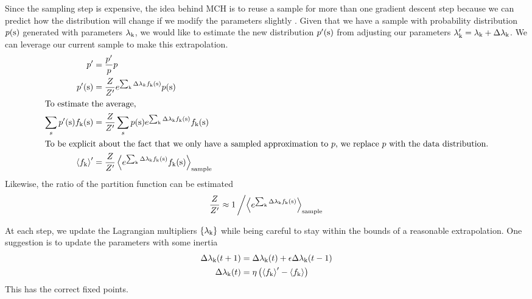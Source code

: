 \documentclass[aps,prl,twocolumn,nofootinbib]{revtex4-1}
\begin{document}
Since the sampling step is expensive, the idea behind MCH is to reuse a sample for more than one gradient descent step because we can predict how the distribution will change if we modify the parameters slightly \cite{Broderick:2007wq}. Given that we have a sample with probability distribution $p({\rm s})$ generated with parameters $\lambda_{\rm k}$, we would like to estimate the new distribution $p'({\rm s})$ from adjusting our parameters $\lambda_{\rm k}' = \lambda_{\rm k}+\Delta\lambda_{\rm k}$. We can leverage our current sample to make this extrapolation.
\begin{align}
	p' &= \frac{p'}{p}p\\
	p'({\rm s})	&= \frac{Z}{Z'}e^{\sum_{\rm k} \Delta\lambda_k f_{\rm k}({\rm s})} p({\rm s})\\
\intertext{To estimate the average,}
	\sum_s p'({\rm s}) f_{\rm k}({\rm s}) &= \frac{Z}{Z'} \sum_s p({\rm s}) e^{\sum_{\rm k} \Delta\lambda_{\rm k} f_{\rm k}({\rm s})} f_{\rm k}({\rm s})\\
\intertext{To be explicit about the fact that we only have a sampled approximation to $p$, we replace $p$ with the data distribution.}
	\left<f_{\rm k}\right>' &= \frac{Z}{Z'} \left<e^{\sum_{\rm k} \Delta\lambda_{\rm k} f_{\rm k}({\rm s})} f_{\rm k}({\rm s})\right>_{\rm sample}
\end{align}
Likewise, the ratio of the partition function can be estimated
\begin{align}
	\frac{Z}{Z'} \approx 1\left/\left<e^{\sum_{\rm k} \Delta\lambda_{\rm k} f_{\rm k}({\rm s})}\right>_{\rm sample}\right.
\end{align}

At each step, we update the Lagrangian multipliers $\{\lambda_{\rm k}\}$ while being careful to stay within the bounds of a reasonable extrapolation. One suggestion is to update the parameters with some inertia
\begin{align}
	\Delta\lambda_{\rm k}(t+1) &= \Delta \lambda_{\rm k}(t) + \epsilon \Delta\lambda_{\rm k}(t-1)\label{eq:mch learn1}\\
	\Delta \lambda_{\rm k}(t) &= \eta\left(\left<f_{\rm k}\right>'-\left<f_{\rm k}\right>\right)\label{eq:mch learn2}
\end{align}
This has the correct fixed points.
\end{document}
